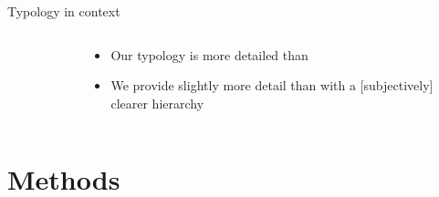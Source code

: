 \documentclass[9pt]{beamer}
\begin{document}
\begin{frame}{Typology in context}
\begin{columns}
\begin{column}{0.618\linewidth}
\begin{figure}
		\end{figure}
	\end{column}
	\begin{column}{0.382\linewidth}
		\begin{itemize}
			\item<1-> Our typology is more detailed than \citep{grantham_research_institute_on_climate_change_and_the_environment_climate_2022}
			\item<2-> We provide slightly more detail than \citep{new_climate_institute_database_2020} with a [subjectively] clearer hierarchy
		\end{itemize}
	\end{column}
\end{columns}
\end{frame}

\section{Methods}
\end{document}
